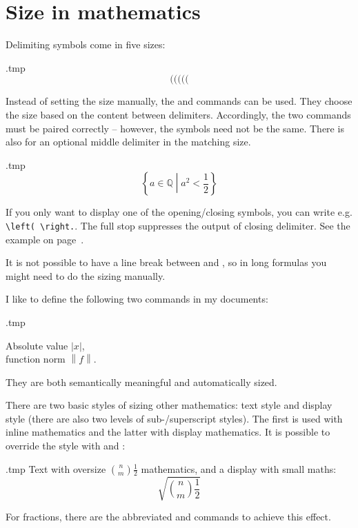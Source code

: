 %
%



%
%
%
\section{Size in mathematics}

Delimiting symbols come in five sizes:
\begin{VerbatimOut}{\jobname.tmp}
\[
( \big( \Big( \bigg( \Bigg(
\]
\end{VerbatimOut}
\ShowExample
%
Instead of setting the size manually,
the  and  commands can be used.
They choose the size based on the content between delimiters.
Accordingly, the two commands must be paired correctly
-- however, the symbols need not be the same.
There is also  for an optional middle delimiter in the matching size.
%
\begin{VerbatimOut}{\jobname.tmp}
\[
\left\{ a \in \mathbb Q
  \middle| a^2 < \frac 1 2 \right\}
\]
\end{VerbatimOut}
\ShowExample
%
If you only want to display one of the opening/closing symbols,
you can write e.g. \verb|\left( \right.|.
The full stop suppresses the output of closing delimiter.
See the example on page~\pageref{ex:math equations in cases}.

\begin{gotcha}
It is not possible to have a line break between  and ,
so in long formulas you might need to do the sizing manually.
\end{gotcha}

\begin{practices}
I like to define the following two commands in my documents:
%
\begin{VerbatimOut}{\jobname.tmp}
\newcommand{\abs}[1]{\left|#1\right|}
\newcommand{\norm}[1]{\left\|#1\right\|}

Absolute value $\abs x$,\\
function norm $\norm f$.
\end{VerbatimOut}
\ShowExample
%
They are both semantically meaningful and automatically sized.
\end{practices}

There are two basic styles of sizing other mathematics: text style and display style
(there are also two levels of sub-/superscript styles).
The first is used with inline mathematics and the latter with display mathematics.
It is possible to override the style with  and :
%
\begin{VerbatimOut}{\jobname.tmp}
Text with oversize
$\displaystyle \binom n m \frac 1 2$
mathematics, and a display with small maths:
\[
\sqrt{\textstyle \binom n m \frac 1 2}
\]
\end{VerbatimOut}
\ShowExample
%
For fractions, there are the abbreviated  and  commands
to achieve this effect.


